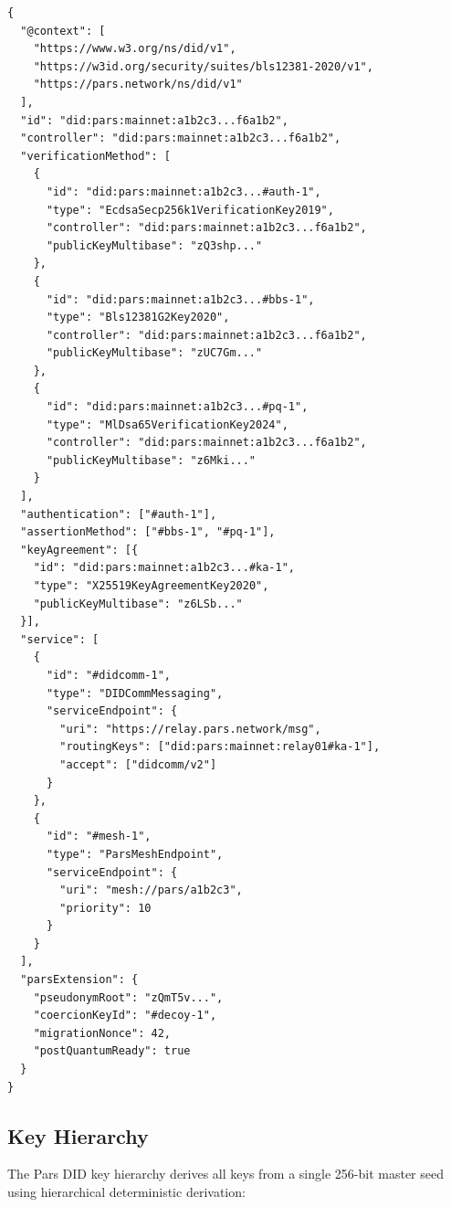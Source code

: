 \documentclass[11pt,a4paper]{article}
\begin{document}
\begin{lstlisting}[language={},caption={Pars DID Document example}]
{
  "@context": [
    "https://www.w3.org/ns/did/v1",
    "https://w3id.org/security/suites/bls12381-2020/v1",
    "https://pars.network/ns/did/v1"
  ],
  "id": "did:pars:mainnet:a1b2c3...f6a1b2",
  "controller": "did:pars:mainnet:a1b2c3...f6a1b2",
  "verificationMethod": [
    {
      "id": "did:pars:mainnet:a1b2c3...#auth-1",
      "type": "EcdsaSecp256k1VerificationKey2019",
      "controller": "did:pars:mainnet:a1b2c3...f6a1b2",
      "publicKeyMultibase": "zQ3shp..."
    },
    {
      "id": "did:pars:mainnet:a1b2c3...#bbs-1",
      "type": "Bls12381G2Key2020",
      "controller": "did:pars:mainnet:a1b2c3...f6a1b2",
      "publicKeyMultibase": "zUC7Gm..."
    },
    {
      "id": "did:pars:mainnet:a1b2c3...#pq-1",
      "type": "MlDsa65VerificationKey2024",
      "controller": "did:pars:mainnet:a1b2c3...f6a1b2",
      "publicKeyMultibase": "z6Mki..."
    }
  ],
  "authentication": ["#auth-1"],
  "assertionMethod": ["#bbs-1", "#pq-1"],
  "keyAgreement": [{
    "id": "did:pars:mainnet:a1b2c3...#ka-1",
    "type": "X25519KeyAgreementKey2020",
    "publicKeyMultibase": "z6LSb..."
  }],
  "service": [
    {
      "id": "#didcomm-1",
      "type": "DIDCommMessaging",
      "serviceEndpoint": {
        "uri": "https://relay.pars.network/msg",
        "routingKeys": ["did:pars:mainnet:relay01#ka-1"],
        "accept": ["didcomm/v2"]
      }
    },
    {
      "id": "#mesh-1",
      "type": "ParsMeshEndpoint",
      "serviceEndpoint": {
        "uri": "mesh://pars/a1b2c3",
        "priority": 10
      }
    }
  ],
  "parsExtension": {
    "pseudonymRoot": "zQmT5v...",
    "coercionKeyId": "#decoy-1",
    "migrationNonce": 42,
    "postQuantumReady": true
  }
}
\end{lstlisting}

\subsection{Key Hierarchy}

The Pars DID key hierarchy derives all keys from a single 256-bit master seed
using hierarchical deterministic derivation:
\end{document}
